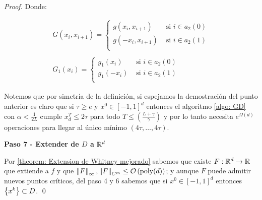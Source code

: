 \begin{proof}
	Donde:
	
	\begin{equation*}
		\begin{array}{l}
		G(x_i, x_{i+1}) = \left\lbrace \begin{array}{cc}
			g(x_i, x_{i+1}) & \text{ si } i \in a_2(0) \\
			g(-x_i, x_{i+1}) & \text{ si } i \in a_2(1) \\			
		\end{array}\right. \\
		\\
		G_1(x_i) = \left\lbrace \begin{array}{cc}
			g_1(x_i) & \text{ si } i \in a_2(0) \\
			g_1(-x_i) & \text{ si } i \in a_2(1) \\			
		\end{array}\right.
		\end{array}
	\end{equation*}
	
	Notemos que por simetr\'ia de la definici\'on, si espejamos la demostraci\'on del punto anterior es claro que si $\tau \geq e$ y $x^0 \in [-1,1]^d$ entonces el algoritmo \ref{algo: GD} con $\alpha < \frac{1}{2L}$ cumple $x_d^T \leq 2\tau$ para todo $T \leq \left(\frac{L + \gamma}{\gamma}\right)$ y por lo tanto necesita $e^{\Omega(d)}$ operaciones para llegar al \'unico m\'inimo $\left(4\tau, \dots, 4\tau\right)$.
	
	\medskip
	
	\textbf{Paso 7 - Extender de $D$ a ${\mathbb{R}}^d$}
	
	\medskip
	
	Por \ref{theorem: Extension de Whitney mejorado} sabemos que existe $F : {\mathbb{R}}^d \rightarrow {\mathbb{R}}$ que extiende a $f$ y que $\left\lVert F\right\rVert_{\infty}, \left\lVert F\right\rVert_{C^m} \leq \mathcal{O}\left(\text{poly}(d)\right)$; y aunque $F$ puede admitir nuevos puntos cr\'iticos, del paso 4 y 6 sabemos que si $x^0 \in [-1,1]^d$ entonces $\left\lbrace x^k\right\rbrace \subset D$. \qed
	
\end{proof}